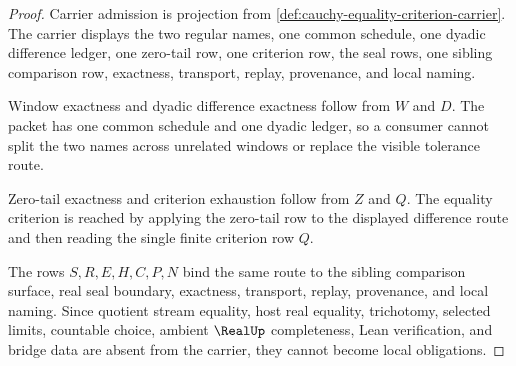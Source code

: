 \begin{proof}
Carrier admission is projection from \autoref{def:cauchy-equality-criterion-carrier}. The carrier displays the two regular names, one common schedule, one dyadic difference ledger, one zero-tail row, one criterion row, the seal rows, one sibling comparison row, exactness, transport, replay, provenance, and local naming.

Window exactness and dyadic difference exactness follow from $W$ and $D$. The packet has one common schedule and one dyadic ledger, so a consumer cannot split the two names across unrelated windows or replace the visible tolerance route.

Zero-tail exactness and criterion exhaustion follow from $Z$ and $Q$. The equality criterion is reached by applying the zero-tail row to the displayed difference route and then reading the single finite criterion row $Q$.

The rows $S,R,E,H,C,P,N$ bind the same route to the sibling comparison surface, real seal boundary, exactness, transport, replay, provenance, and local naming. Since quotient stream equality, host real equality, trichotomy, selected limits, countable choice, ambient $\RealUp$ completeness, Lean verification, and bridge data are absent from the carrier, they cannot become local obligations.
\end{proof}


